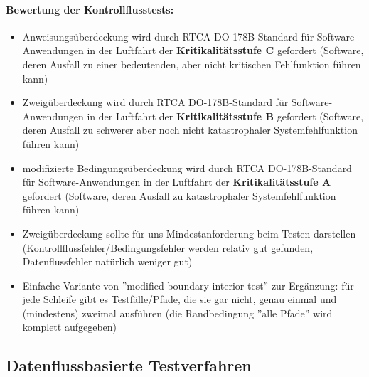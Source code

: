\paragraph{Bewertung der Kontrollflusstests:}
\begin{itemize}
	\item Anweisungsüberdeckung wird durch RTCA DO-178B-Standard für Software-Anwendungen in der Luftfahrt der \textbf{Kritikalitätsstufe C} gefordert (Software, deren Ausfall zu einer bedeutenden, aber nicht kritischen Fehlfunktion führen kann)
	\item Zweigüberdeckung wird durch RTCA DO-178B-Standard für Software-Anwendungen in der Luftfahrt der \textbf{Kritikalitätsstufe B} gefordert (Software, deren Ausfall zu schwerer aber noch nicht katastrophaler Systemfehlfunktion führen kann)
	\item modifizierte Bedingungsüberdeckung wird durch RTCA DO-178B-Standard für Software-Anwendungen in der Luftfahrt der \textbf{Kritikalitätsstufe A} gefordert (Software, deren Ausfall zu katastrophaler Systemfehlfunktion führen kann)
	\item Zweigüberdeckung sollte für uns Mindestanforderung beim Testen darstellen (Kontrollflussfehler/Bedingungsfehler werden relativ gut gefunden, Datenflussfehler natürlich weniger gut)
	\item Einfache Variante von ''modified boundary interior test'' zur Ergänzung: für jede Schleife gibt es Testfälle/Pfade, die sie gar nicht, genau einmal und (mindestens) zweimal ausführen (die Randbedingung ''alle Pfade'' wird komplett aufgegeben)
\end{itemize}

\subsection{Datenflussbasierte Testverfahren}

